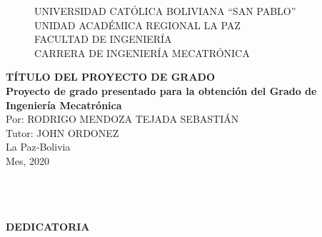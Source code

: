 \begin{center}
\begin{figure}
\centering%
\textsc{\large UNIVERSIDAD CAT\'OLICA BOLIVIANA ``SAN PABLO'' }\\[0.3cm] %
\textsc{\large UNIDAD ACAD\'EMICA REGIONAL LA PAZ}\\[0.3cm] %
\textsc{\large FACULTAD DE INGENIER\'IA}\\[0.3cm]
\textsc{\normalsize  CARRERA DE INGENIER\'IA MECATR\'ONICA}\\[0.1cm]
%
\end{figure}
\textbf{\large
T\'ITULO DEL PROYECTO DE GRADO}\\[0.5cm]

\thispagestyle{empty} \vspace*{0.01cm} \textbf{\large Proyecto de grado presentado para la obtenci\'on del Grado de Ingenier\'ia Mecatr\'onica}\\[0.65cm]

\thispagestyle{empty} \vspace*{0.01cm} \normalsize Por: RODRIGO MENDOZA TEJADA SEBASTI\'AN  \\[0.8cm]

\thispagestyle{empty} \vspace*{0.01cm} \normalsize Tutor: JOHN ORDONEZ\\[1.5cm]

\vspace*{0.01cm} \normalsize La Paz-Bolivia\\[0.25cm]
\vspace*{0.01cm} \normalsize Mes, 2020
\end{center}

\newpage{\pagestyle{empty}\cleardoublepage}

\newpage

\newpage{\pagestyle{empty}\cleardoublepage}

\newpage
\thispagestyle{empty} \textbf{}\normalsize
\\\\\\%
\textbf{DEDICATORIA}\\[4.0cm]

